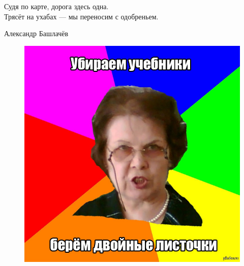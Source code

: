 \documentclass[10pt]{article}
\begin{document}
\epigraph{Судя по карте, дорога здесь одна.\\Трясёт на ухабах --- мы переносим с одобреньем.}{Александр Башлачёв} 

\vfill
\begin{figure}[h]
    \centering
    \includegraphics[width = 0.7\linewidth]{babka.jpg}
\end{figure}
\vfill
\end{document}
